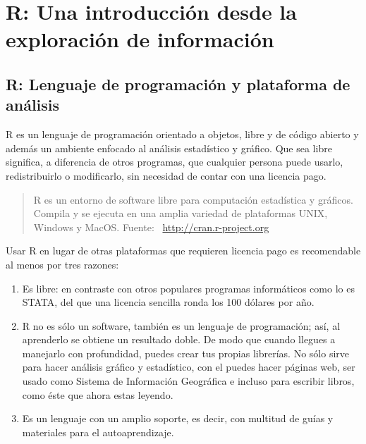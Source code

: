 \documentclass[
  11pt,
  oneside]{book}
\providecommand{\tightlist}{%
  \setlength{\itemsep}{0pt}\setlength{\parskip}{0pt}}
\begin{document}
\hypertarget{r-una-introducciuxf3n-desde-la-exploraciuxf3n-de-informaciuxf3n}{%
\chapter{R: Una introducción desde la exploración de información}\label{r-una-introducciuxf3n-desde-la-exploraciuxf3n-de-informaciuxf3n}}

\hypertarget{r-lenguaje-de-programaciuxf3n-y-plataforma-de-anuxe1lisis}{%
\section{R: Lenguaje de programación y plataforma de análisis}\label{r-lenguaje-de-programaciuxf3n-y-plataforma-de-anuxe1lisis}}

R es un lenguaje de programación orientado a objetos, libre y de código abierto y además un ambiente enfocado al análisis estadístico y gráfico. Que sea libre significa, a diferencia de otros programas, que cualquier persona puede usarlo, redistribuirlo o modificarlo, sin necesidad de contar con una licencia pago.

\begin{quote}
R es un entorno de software libre para computación estadística y gráficos. Compila y se ejecuta en una amplia variedad de plataformas UNIX, Windows y MacOS. Fuente: ~\url{http://cran.r-project.org}\\
\end{quote}

Usar R en lugar de otras plataformas que requieren licencia pago es recomendable al menos por tres razones:

\begin{enumerate}
\def\labelenumi{\roman{enumi}.}
\tightlist
\item
  Es libre: en contraste con otros populares programas informáticos como lo es STATA, del que una licencia sencilla ronda los 100 dólares por año.\\
\item
  R no es sólo un software, también es un lenguaje de programación; así, al aprenderlo se obtiene un resultado doble. De modo que cuando llegues a manejarlo con profundidad, puedes crear tus propias librerías. No sólo sirve para hacer análisis gráfico y estadístico, con el puedes hacer páginas web, ser usado como Sistema de Información Geográfica e incluso para escribir libros, como éste que ahora estas leyendo.
\item
  Es un lenguaje con un amplio soporte, es decir, con multitud de guías y materiales para el autoaprendizaje.
\end{enumerate}
\end{document}
